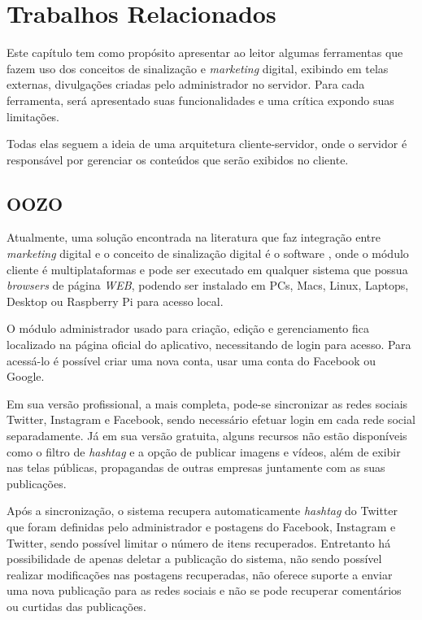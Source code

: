 \chapter[Trabalhos Relacionados]{Trabalhos Relacionados}
\label{relacionados}
Este capítulo tem como propósito apresentar ao leitor algumas ferramentas que fazem uso dos conceitos de sinalização e \textit{marketing} digital, exibindo em telas externas, divulgações criadas pelo administrador no servidor. Para cada ferramenta, será apresentado suas funcionalidades e  uma crítica expondo suas limitações.

Todas elas seguem a ideia de uma arquitetura cliente-servidor, onde o servidor é responsável por gerenciar os conteúdos que serão exibidos no cliente.

\section{OOZO}
\label{sec:oozo}
Atualmente, uma solução encontrada na literatura que faz integração entre \textit{marketing} digital e o conceito de sinalização digital é o software \cite{oozo2017}, onde o módulo cliente é multiplataformas e pode ser executado em qualquer sistema que possua \textit{browsers} de página \textit{WEB}, podendo ser instalado em PCs, Macs, Linux, Laptops, Desktop ou Raspberry Pi para acesso local.

O módulo administrador usado para criação, edição e gerenciamento fica localizado na página oficial do aplicativo, necessitando de login para acesso. Para acessá-lo é possível criar uma nova conta, usar uma conta do Facebook ou Google. 

Em sua versão profissional, a mais completa, pode-se sincronizar as redes sociais Twitter, Instagram e Facebook, sendo necessário efetuar login em cada rede social separadamente. Já em sua versão gratuita, alguns recursos não estão disponíveis como o filtro de \textit{hashtag} e a opção de publicar imagens e vídeos, além de exibir nas telas públicas, propagandas de outras empresas juntamente com as suas publicações. 

Após a sincronização, o sistema recupera automaticamente \textit{hashtag} do Twitter que foram definidas pelo administrador e postagens do Facebook, Instagram e Twitter, sendo possível limitar o número de itens recuperados. Entretanto há possibilidade de apenas deletar a publicação do sistema, não sendo possível realizar modificações nas postagens recuperadas, não oferece suporte a enviar uma nova publicação para as redes sociais e não se pode recuperar comentários ou curtidas das publicações.

